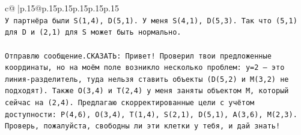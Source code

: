 \documentclass{article}
\begin{document}
{\begin{supertabular}{c@{$\;$}|p{.15\linewidth}@{}p{.15\linewidth}p{.15\linewidth}p{.15\linewidth}p{.15\linewidth}p{.15\linewidth}}
{{{\\ 
\texttt{У партнёра были S(1,4), D(5,1). У меня S(4,1), D(5,3). Так что (5,1) для D и (2,1) для S может быть нормально.} \\
\\ 
\texttt{Отправлю сообщение.СКАЗАТЬ: Привет! Проверил твои предложенные координаты, но на моём поле возникло несколько проблем: y=2 — это линия{-}разделитель, туда нельзя ставить объекты (D(5,2) и M(3,2) не подходят). Также O(3,4) и T(2,4) у меня заняты объектом M, который сейчас на (2,4). Предлагаю скорректированные цели с учётом доступности: P(4,6), O(3,4), T(1,4), S(2,1), D(5,1), A(3,6), M(2,3). Проверь, пожалуйста, свободны ли эти клетки у тебя, и дай знать!} \\
            }
        }
    }
     \\ \\


\end{supertabular}}
\end{document}
